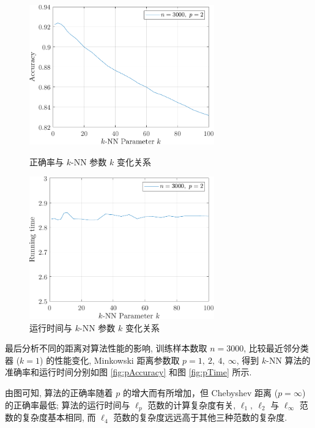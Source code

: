 \documentclass{article}
\begin{document}
\begin{figure}[htbp]
  \centering
  \begin{minipage}[t]{0.48\textwidth}
    \centering
    \includegraphics[width=8cm]{kAccuracy.pdf}
    \caption{正确率与 $k$-NN 参数 $k$ 变化关系}
    \label{fig:kAccuracy}
  \end{minipage}
  \begin{minipage}[t]{0.48\textwidth}
    \centering
    \includegraphics[width=8cm]{kTime.pdf}
    \caption{运行时间与 $k$-NN 参数 $k$ 变化关系}
    \label{fig:kTime}
  \end{minipage}
\end{figure}

最后分析不同的距离对算法性能的影响, 训练样本数取 $n=3000$, 比较最近邻分类器 ($k=1$) 的性能变化, Minkowski 距离参数取 $p=1,~2,~4,~\infty$, 得到 $k$-NN 算法的准确率和运行时间分别如图 \ref{fig:pAccuracy} 和图 \ref{fig:pTime} 所示.

由图可知, 算法的正确率随着 $p$ 的增大而有所增加，但 Chebyshev 距离 ($p=\infty$) 的正确率最低; 算法的运行时间与 $\ell_p$ 范数的计算复杂度有关, $\ell_1,~\ell_2$ 与 $\ell_\infty$ 范数的复杂度基本相同, 而 $\ell_4$ 范数的复杂度远远高于其他三种范数的复杂度.
\end{document}
